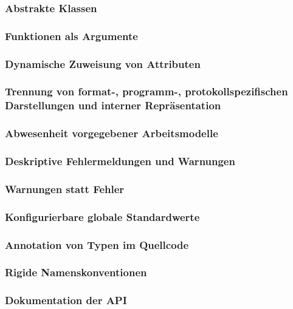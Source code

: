 \documentclass[12pt,a4paper,ngerman]{article}
\begin{document}
\subsubsection{Abstrakte Klassen}

\subsubsection{Funktionen als Argumente}

\subsubsection{Dynamische Zuweisung von Attributen}

\subsubsection{Trennung von format-, programm-, protokollspezifischen Darstellungen und interner Repräsentation}

\subsubsection{Abwesenheit vorgegebener Arbeitsmodelle}

\subsubsection{Deskriptive Fehlermeldungen und Warnungen}

\subsubsection{Warnungen statt Fehler}

\subsubsection{Konfigurierbare globale Standardwerte}

\subsubsection{Annotation von Typen im Quellcode}

\subsubsection{Rigide Namenskonventionen}

\subsubsection{Dokumentation der API}
\end{document}
